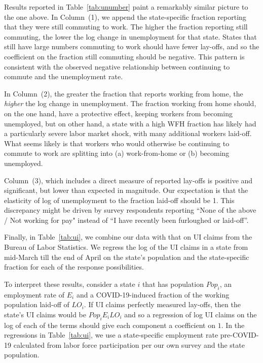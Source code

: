 \documentclass[12pt]{article}
\begin{document}
Results reported in Table~\ref{tab:unumber} paint a remarkably similar picture to the one above. In Column~(1), we append the state-specific fraction reporting that they were still commuting to work.
The higher the fraction reporting still commuting, the lower the log change in unemployment for that state.
States that still have large numbers commuting to work should have fewer lay-offs, and so the coefficient on the fraction still commuting should be negative. This pattern is consistent with the observed negative relationship between continuing to commute and the unemployment rate.

In Column~(2), the greater the fraction that reports working from home, the \emph{higher} the log change in unemployment. The fraction working from home should, on the one hand, have a protective effect, keeping workers from becoming unemployed, but on other hand, a state with a high WFH fraction has likely had a particularly severe labor market shock, with many additional workers laid-off. What seems likely is that workers who would otherwise be continuing to commute to work are splitting into (a) work-from-home or (b) becoming unemployed.

Column~(3), which includes a direct measure of reported lay-offs is positive and significant, but lower than expected in magnitude. Our expectation is that the elasticity of log of unemployment to the fraction laid-off should be 1. This discrepancy might be driven by survey respondents reporting ``None of the above / Not working for pay" instead of ``I have recently been furloughed or laid-off''.



Finally, in Table~\ref{tab:ui}, we combine our data with that on UI claims from the Bureau of Labor Statistics. We regress the log of the UI claims in a state from mid-March till the end of April on the state's population and the state-specific fraction for each of the response possibilities.  

To interpret these results, consider a state $i$ that has population $Pop_i$, an employment rate of $E_i$ and a COVID-19-induced fraction of the working population laid-off of $LO_i$. If UI claims perfectly measured lay-offs, then the state's UI claims would be $Pop_i E_i LO_i$ and so a regression of log UI claims on the log of each of the terms should give each component a coefficient on $1$. 
In the regressions in Table~\ref{tab:ui}, we use a state-specific employment rate pre-COVID-19 calculated from labor force participation per our own survey and the state population. 
\end{document}
